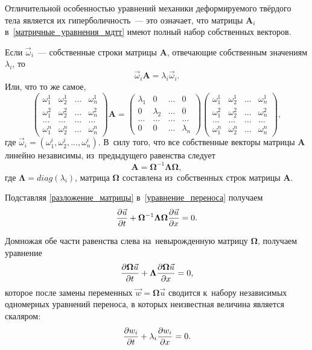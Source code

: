 \documentclass[thesis.tex]{subfiles}
\begin{document}
Отличительной особенностью уравнений механики деформируемого твёрдого тела является их гиперболичность~--- это означает,
что матрицы $\mathbf A_i$ в~\eqref{матричные_уравнения_мдтт} имеют полный набор собственных векторов.

Если $\vec \omega_i$~--- собственные строки матрицы $\mathbf A$, отвечающие собственным значениям $\lambda_i$, то
\[
    \vec\omega_i \mathbf A = \lambda_i\vec \omega_i.
\]
Или, что то же самое,
\[
    \begin{pmatrix}
        \omega_1^1 & \omega_2^1 & \dots & \omega_n^1 \\
        \omega_1^2 & \omega_2^2 & \dots & \omega_n^2 \\
        \dots      & \dots      & \dots & \dots      \\
        \omega_1^n & \omega_2^n & \dots & \omega_n^n
    \end{pmatrix} \mathbf A  = \begin{pmatrix}
        \lambda_1 & 0         & \dots & 0       \\
        0         & \lambda_2 & \dots & 0      \\
        \dots     & \dots     & \dots & \dots  \\
        0         & 0         & \dots & \lambda_n
    \end{pmatrix}\begin{pmatrix}
        \omega_1^1 & \omega_2^1 & \dots & \omega_n^1 \\
        \omega_1^2 & \omega_2^2 & \dots & \omega_n^2 \\
        \dots      & \dots      & \dots & \dots      \\
        \omega_1^n & \omega_2^n & \dots & \omega_n^n
    \end{pmatrix},
\]
где $\vec \omega_i=(\omega_1^i,\omega_2^i,\dots,\omega_n^i)$. В~силу того, что все собственные векторы матрицы $\mathbf A$
линейно независимы, из~предыдущего равенства следует
\begin{equation}
    \mathbf A =  \bm \Omega^{-1} \bm \Lambda \bm \Omega,
    \label{разложение_матрицы}
\end{equation}
где $\bm \Lambda=diag(\lambda_i)$, матрица $\bm \Omega$ составлена из~собственных строк матрицы $\mathbf A$.

Подставляя \ref{разложение_матрицы} в~\ref{уравнение_переноса} получаем
\[
    \frac{\partial{\vec u}}{\partial{t}} + \bm \Omega^{-1} \bm \Lambda \bm \Omega\frac{\partial{\vec u}}{\partial{x}} = 0.
\]

Домножая обе части равенства слева на~невырожденную матрицу $\bm \Omega$, получаем уравнение
\[
    \frac{\partial{\bm \Omega\vec u}}{\partial{t}} + \bm \Lambda \frac{\partial{\bm \Omega \vec u}}{\partial{x}} = 0,
\]
которое после замены переменных $\vec w=\bm \Omega\vec u$ сводится к~набору независимых одномерных уравнений переноса,
в которых неизвестная величина является скаляром:
\begin{equation}
    \frac{\partial{w_i}}{\partial{t}} + \lambda_i\frac{\partial{w_i}}{\partial{x}} = 0.
    \label{уравнение_переноса_для_инвариантов_римана}
\end{equation}
\end{document}
